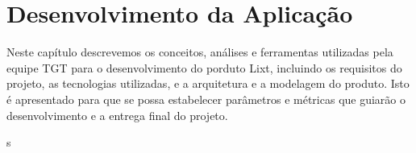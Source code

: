 \chapter{Desenvolvimento da Aplicação}

Neste capítulo descrevemos os conceitos, análises e ferramentas
utilizadas pela equipe TGT para o desenvolvimento do porduto Lixt,
incluindo os requisitos do projeto, as tecnologias utilizadas, e a
arquitetura e a modelagem do produto.
Isto é apresentado para que se possa estabelecer parâmetros e métricas
que guiarão o desenvolvimento e a entrega final do projeto.













s